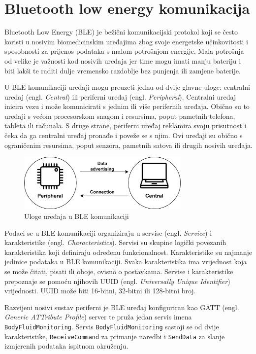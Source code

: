 \documentclass[../diplomski_rad.tex]{subfiles}
\begin{document}
\section{Bluetooth low energy komunikacija}

Bluetooth Low Energy (BLE) je bežični komunikacijski protokol koji se često koristi u 
nosivim biomedicinskim uređajima zbog svoje energetske učinkovitosti i sposobnosti za prijenos podataka s malom potrošnjom energije.
Mala potrošnja od velike je važnosti kod nosivih uređaja jer time mogu imati manju bateriju i biti lakši te raditi dulje vremensko razdoblje 
bez punjenja ili zamjene baterije. 

U BLE komunikaciji uređaji mogu preuzeti jednu od dvije glavne uloge:
centralni uređaj (engl. \textit{Central}) ili periferni uređaj (engl. \textit{Peripheral}). 
Centralni uređaj inicira vezu i može komunicirati s jednim ili više perifernih uređaja. 
Obično su to uređaji s većom procesorskom snagom i resursima, poput pametnih telefona, tableta ili računala. 
S druge strane, periferni uređaj reklamira svoju prisutnost i čeka da ga centralni uređaj 
pronađe i poveže se s njim. Ovi uređaji su obično s ograničenim resursima, 
poput senzora, pametnih satova ili drugih nosivih uređaja.

\begin{figure}[htb]
    \centering
    \includegraphics[width=0.75\textwidth]{Figures/ble_role.png} 
    \caption{Uloge uređaja u BLE komunikaciji}
    \label{slk:max_30009_clock}
\end{figure}

Podaci se u BLE komunikaciji organiziraju u servise (engl. \textit{Service}) i karakteristike (engl. \textit{Characteristics}).
Servisi su skupine logički povezanih karakteristika koji definiraju određenu funkcionalnost. 
Karakteristike su najmanje jedinice podataka u BLE komunikaciji. 
Svaka karakteristika ima vrijednost koja se može čitati, pisati ili oboje, ovisno o postavkama. 
Servise i karakteristike prepoznaje se pomoću njihovih UUID (engl. \textit{Universally Unique Identifier}) vrijednosti. 
UUID može biti 16-bitni, 32-bitni ili 128-bitni broj.

Razvijeni nosivi sustav periferni je BLE uređaj konfiguriran kao GATT (engl. \textit{Generic ATTribute Profile}) server 
te pruža jedan servis imena \texttt{BodyFluidMonitoring}. 
Servis \texttt{BodyFluidMonitoring} sastoji se od dvije karakteristike, \texttt{ReceiveCommand} za primanje naredbi i 
\texttt{SendData} za slanje izmjerenih podataka ispitnom okruženju.
\end{document}
